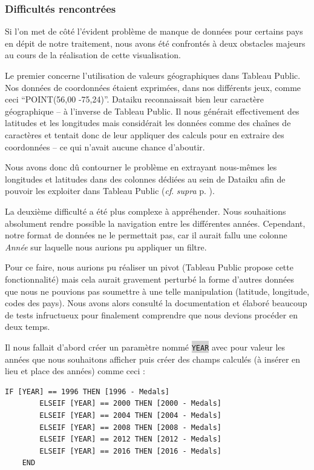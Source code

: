 \documentclass[hidelinks, 12pt]{report}
\newcommand{\code}[1]{\colorbox{LightGray}{\texttt{#1}}}
\begin{document}
\subsubsection{Difficultés rencontrées}

Si l'on met de côté l'évident problème de manque de données pour certains pays en dépit de notre traitement, nous avons été confrontés à deux obstacles majeurs au cours de la réalisation de cette visualisation.

Le premier concerne l'utilisation de valeurs géographiques dans Tableau Public. Nos données de coordonnées étaient exprimées, dans nos différents jeux, comme ceci \enquote{POINT(56,00 -75,24)}. Dataiku reconnaissait bien leur caractère géographique -- à l'inverse de Tableau Public. Il nous générait effectivement des latitudes et les longitudes mais considérait les données comme des chaînes de caractères et tentait donc de leur appliquer des calculs pour en extraire des coordonnées -- ce qui n'avait aucune chance d'aboutir.

Nous avons donc dû contourner le problème en extrayant nous-mêmes les longitudes et latitudes dans des colonnes dédiées au sein de Dataiku afin de pouvoir les exploiter dans Tableau Public (\textit{cf}. \textit{supra} p. \pageref{casse}).

La deuxième difficulté a été plus complexe à appréhender. Nous souhaitions absolument rendre possible la navigation entre les différentes années. Cependant, notre format de données ne le permettait pas, car il aurait fallu une colonne \textit{Année} sur laquelle nous aurions pu appliquer un filtre.

Pour ce faire, nous aurions pu réaliser un pivot (Tableau Public propose cette fonctionnalité) mais cela aurait gravement perturbé la forme d'autres données que nous ne pouvions pas soumettre à une telle manipulation (latitude, longitude, codes des pays). Nous avons alors consulté la documentation et élaboré beaucoup de tests infructueux pour finalement comprendre que nous devions procéder en deux temps.

Il nous fallait d'abord créer un paramètre nommé \code{YEAR} avec pour valeur les années que nous souhaitons afficher puis créer des champs calculés (à insérer en lieu et place des années) comme ceci :

\begin{lstlisting}[language=tableau]
	IF [YEAR] == 1996 THEN [1996 - Medals]
		ELSEIF [YEAR] == 2000 THEN [2000 - Medals]
		ELSEIF [YEAR] == 2004 THEN [2004 - Medals]
		ELSEIF [YEAR] == 2008 THEN [2008 - Medals]
		ELSEIF [YEAR] == 2012 THEN [2012 - Medals]
		ELSEIF [YEAR] == 2016 THEN [2016 - Medals]
	END
\end{lstlisting}
\end{document}
